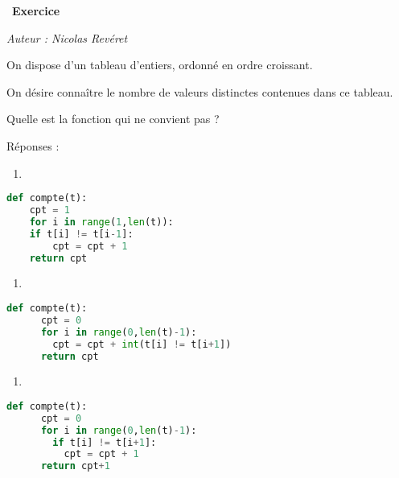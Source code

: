 \documentclass[
  11pt,
]{article}
\providecommand{\tightlist}{%
  \setlength{\itemsep}{0pt}\setlength{\parskip}{0pt}}
\newcounter{exo}
\newenvironment{exercice}[1]
{\par \medskip   \addtocounter{exo}{1} \noindent  
\begin{bclogo}[arrondi =0.1,   noborder = true, logo=\bccrayon, marge=4]{~\textbf{Exercice} \textbf{\theexo} {\itshape #1} }  \par}
{
\end{bclogo}
 \par \bigskip }
\newcounter{def}
\begin{document}
\begin{exercice}{}

\emph{Auteur : Nicolas Revéret}

On dispose d'un tableau d'entiers, ordonné en ordre croissant.

On désire connaître le nombre de valeurs distinctes contenues dans ce
tableau.

Quelle est la fonction qui ne convient pas ?

Réponses :

\begin{enumerate}
\def\labelenumi{\arabic{enumi}.}
\tightlist
\item
\end{enumerate}

\begin{lstlisting}[language=Python]
def compte(t):
    cpt = 1
    for i in range(1,len(t)):
    if t[i] != t[i-1]:
        cpt = cpt + 1
    return cpt
\end{lstlisting}

\begin{enumerate}
\def\labelenumi{\Alph{enumi})}
\setcounter{enumi}{1}
\tightlist
\item
\end{enumerate}

\begin{lstlisting}[language=Python]
    def compte(t):
      cpt = 0
      for i in range(0,len(t)-1):
        cpt = cpt + int(t[i] != t[i+1])
      return cpt
\end{lstlisting}

\begin{enumerate}
\def\labelenumi{\arabic{enumi}.}
\setcounter{enumi}{2}
\tightlist
\item
\end{enumerate}

\begin{lstlisting}[language=Python]
    def compte(t):
      cpt = 0
      for i in range(0,len(t)-1):
        if t[i] != t[i+1]:
          cpt = cpt + 1
      return cpt+1
\end{lstlisting}

\end{exercice}
\end{document}
